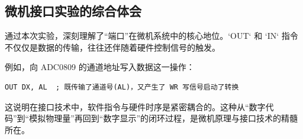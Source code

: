 \documentclass[UTF8]{article}
\begin{document}
\subsection{微机接口实验的综合体会}
    通过本次实验，深刻理解了“端口”在微机系统中的核心地位。`OUT` 和 `IN` 指令不仅仅是数据的传输，往往还伴随着硬件控制信号的触发。
    
    例如，向 ADC0809 的通道地址写入数据这一操作：
\begin{lstlisting}[language={[x86masm]Assembler}]
OUT DX, AL  ; 既传输了通道号(AL)，又产生了 WR 写信号启动了转换
\end{lstlisting}
    这说明在接口技术中，软件指令与硬件时序是紧密耦合的。这种从“数字代码”到“模拟物理量”再回到“数字显示”的闭环过程，是微机原理与接口技术的精髓所在。

\end{document}
